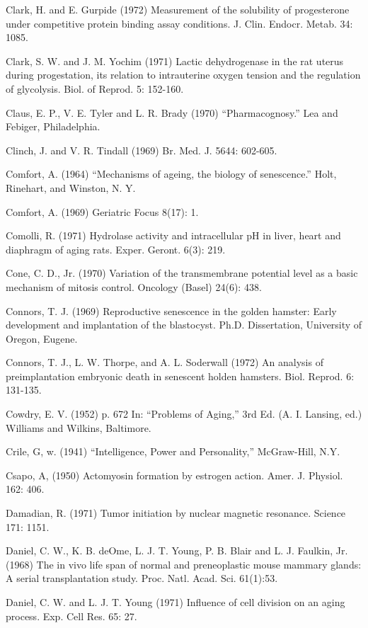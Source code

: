 Clark, H. and E. Gurpide (1972) Measurement of the solubility of progesterone under competitive protein binding assay conditions. J. Clin. Endocr. Metab. 34: 1085.

Clark, S. W. and J. M. Yochim (1971) Lactic dehydrogenase in the rat uterus during progestation, its relation to intrauterine oxygen tension and the regulation of glycolysis. Biol. of Reprod. 5: 152-160.

Claus, E. P., V. E. Tyler and L. R. Brady (1970) ``Pharmacognosy.'' Lea and Febiger, Philadelphia.

Clinch, J. and V. R. Tindall (1969) Br. Med. J. 5644: 602-605.

Comfort, A. (1964) ``Mechanisms of ageing, the biology of senescence.'' Holt, Rinehart, and Winston, N. Y.

Comfort, A. (1969) Geriatric Focus 8(17): 1.

Comolli, R. (1971) Hydrolase activity and intracellular pH in liver, heart and diaphragm of aging rats. Exper. Geront. 6(3): 219.

Cone, C. D., Jr. (1970) Variation of the transmembrane potential level as a basic mechanism of mitosis control. Oncology (Basel) 24(6): 438.


Connors, T. J. (1969) Reproductive senescence in the golden hamster: Early development and implantation of the blastocyst. Ph.D. Dissertation, University of Oregon, Eugene.

Connors, T. J., L. W. Thorpe, and A. L. Soderwall (1972) An analysis of preimplantation embryonic death in senescent holden hamsters. Biol. Reprod. 6: 131-135.

Cowdry, E. V. (1952) p. 672 In: ``Problems of Aging,'' 3rd Ed. (A. I. Lansing, ed.) Williams and Wilkins, Baltimore.

Crile, G, w. (1941) ``Intelligence, Power and Personality,'' McGraw-Hill, N.Y.

Csapo, A, (1950) Actomyosin formation by estrogen action. Amer. J. Physiol. 162: 406.

Damadian, R. (1971) Tumor initiation by nuclear magnetic resonance. Science 171: 1151.

Daniel, C. W., K. B. deOme, L. J. T. Young, P. B. Blair and L. J. Faulkin, Jr. (1968) The in vivo life span of normal and preneoplastic mouse mammary glands: A serial transplantation study. Proc. Natl. Acad. Sci. 61(1):53.

Daniel, C. W. and L. J. T. Young (1971) Influence of cell division on an aging process. Exp. Cell Res. 65: 27.

